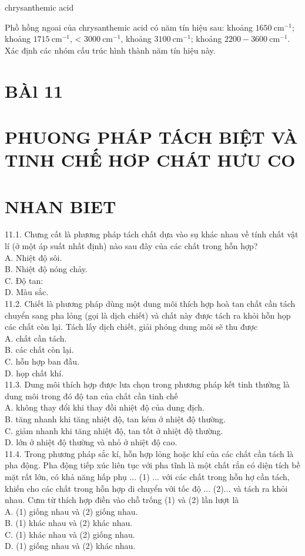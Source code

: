 \documentclass[10pt]{article}
\begin{document}
chrysanthemic acid

Phồ hồng ngoai của chrysanthemic acid có năm tín hiệu sau: khoảng $1650 \mathrm{~cm}^{-1}$; khoảng $1715 \mathrm{~cm}^{-1}$, < $3000 \mathrm{~cm}^{-1}$, khoảng $3100 \mathrm{~cm}^{-1}$; khoảng $2200-3600 \mathrm{~cm}^{-1}$. Xác định các nhóm cấu trúc hình thành năm tín hiệu này.

\section*{BÀl 11}
\section*{PHUONG PHÁP TÁCH BIỆT VÀ TINH CHẾ HƠP CHÁT HƯU CO}
\section*{NHAN BIET}
11.1. Chưng cất là phương pháp tách chất dựa vào sụ khác nhau về tính chất vật lí (ở một áp suất nhất định) nào sau đây của các chất trong hỗn hợp?\\
A. Nhiệt độ sôi.\\
B. Nhiệt độ nóng chảy.\\
C. Độ tan:\\
D. Màu sắc.\\
11.2. Chiết là phương pháp dùng một dung môi thích hợp hoà tan chất cần tách chuyển sang pha lỏng (gọi là dịch chiết) và chất này được tách ra khỏi hỗn họp các chất còn lại. Tách lấy dịch chiết, giải phóng dung môi sẽ thu được\\
A. chất cần tách.\\
B. các chất còn lại.\\
C. hỗn hợp ban đầu.\\
D. họp chất khí.\\
11.3. Dung môi thích hợp được lưa chọn trong phương pháp kết tinh thường là dung môi trong đó độ tan của chất cần tinh chế\\
A. không thay đổi khi thay đồi nhiệt độ của dung địch.\\
B. tăng nhanh khi tăng nhiệt độ, tan kém ở nhiệt độ thường.\\
C. giảm nhanh khi tăng nhiệt độ, tan tốt ở nhiệt độ thường.\\
D. lớn ở nhiệt độ thường và nhỏ ở nhiệt độ cao.\\
11.4. Trong phương pháp sắc kí, hỗn hợp lỏng hoặc khí của các chất cần tách là pha động. Pha động tiếp xúc liên tục với pha tĩnh là một chất rắn có diện tích bề mặt rất lớn, có khả năng hấp phụ ... (1) ... với các chất trong hỗn hợ cần tách, khiến cho các chất trong hỗn hợp di chuyển với tốc độ ... (2)... và tách ra khỏi nhau. Cưm từ thích hợp điền vào chỗ trống (1) và (2) lần lượt là\\
A. (1) giống nhau và (2) giống nhau.\\
B. (1) khác nhau và (2) khác nhau.\\
C. (1) khác nhau và (2) giống nhau.\\
D. (1) giống nhau và (2) khác nhau.
\end{document}
